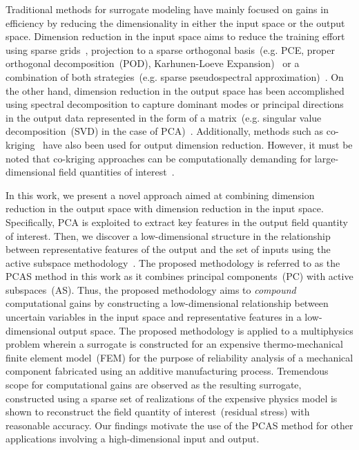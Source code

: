 Traditional methods for surrogate modeling have mainly focused on gains in efficiency by reducing the
dimensionality in either the input space or the output space. Dimension reduction in the input space
aims to reduce the training effort using sparse grids~\cite{Petvipusit:2014,Elsheikh:2014,Zhang:2013,Ma:2009},
projection to a sparse orthogonal basis~(e.g. PCE, proper orthogonal decomposition~(POD),
Karhunen-Loeve Expansion)~\cite{Wang:2005,Galbally:2010,Marzouk:2009} or a combination of both 
strategies~(e.g. sparse pseudospectral approximation)~\cite{Constantine:2012,Winokur:2013,Conrad:2013,Vohra:2017}.
On the other hand, dimension reduction in the output space has been accomplished using spectral decomposition 
to capture dominant modes or principal directions in the output data represented in the form of a 
matrix~(e.g. singular value decomposition~(SVD) in the case of PCA)~\cite{Hombal:2013,Nath:2017,Borgman:1976,Davis:1983}.
Additionally, methods such as co-kriging~\cite{Myers:1982} have also been used for output dimension reduction.  
However, it must be noted
that co-kriging approaches can be computationally demanding for large-dimensional field quantities of interest~\cite{Gogu:2013}. 

In this work, we present a novel approach aimed at combining dimension reduction in the output space with
dimension reduction in the input space. Specifically, PCA is exploited to extract key features in the
output field quantity of interest. Then, we discover a 
low-dimensional structure in the relationship between representative features of the output and the set of inputs using
the active
subspace methodology~\cite{Constantine:2015}. The proposed methodology is
referred to as the PCAS method in this work as it combines principal components~(PC) with active subspaces~(AS).
Thus, the proposed methodology aims to \textit{compound} computational gains by constructing a low-dimensional
relationship between uncertain variables in the input space and representative features in a low-dimensional
output space. The proposed methodology is applied to a multiphysics problem wherein a
surrogate is constructed for an expensive thermo-mechanical finite element model~(FEM) for the purpose of reliability
analysis of a mechanical component fabricated using an additive manufacturing process. Tremendous scope
for computational gains are observed as the resulting surrogate, constructed using a sparse set of realizations
of the expensive physics model is shown to reconstruct the field quantity of interest~(residual stress)
with reasonable accuracy. Our findings motivate the use of the PCAS method for other applications involving
a high-dimensional input and output.     

